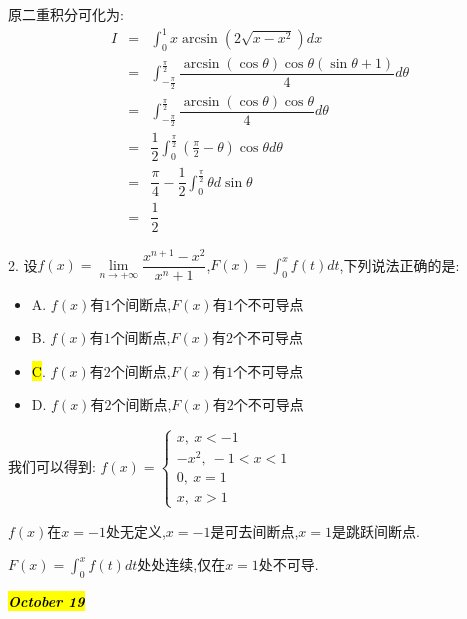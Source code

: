 \begin{solution}

	原二重积分可化为:  
	\begin{eqnarray*}
		I&=&\int_{0}^{1}x\arcsin(2\sqrt{x-x^2})dx\\
		&=&\int_{-\frac{\pi}{2}}^{\frac{\pi}{2}}\dfrac{\arcsin(\cos\theta) \cos\theta(\sin\theta+1)}{4}d\theta\\
		&=&\int_{-\frac{\pi}{2}}^{\frac{\pi}{2}}\dfrac{\arcsin(\cos\theta)\cos\theta}{4}d\theta\\
		&=&\dfrac{1}{2}\int_{0}^{\frac{\pi}{2}}(\frac{\pi}{2}-\theta)\cos\theta d\theta\\
		&=&\dfrac{\pi}{4}-\dfrac{1}{2}\int_{0}^{\frac{\pi}{2}}\theta d\sin\theta\\
		&=&\dfrac{1}{2}
	\end{eqnarray*}
\end{solution}

2. 设$f(x)=\lim\limits_{n\rightarrow+\infty}\dfrac{x^{n+1}-x^2}{x^n+1}$,$F(x)=\int_{0}^{x}f(t)dt$,下列说法正确的是:  
\begin{itemize}
	\item A. $f(x)$有$1$个间断点,$F(x)$有$1$个不可导点
	\item B. $f(x)$有$1$个间断点,$F(x)$有$2$个不可导点
	\item \hl{C}. $f(x)$有$2$个间断点,$F(x)$有$1$个不可导点
	\item D. $f(x)$有$2$个间断点,$F(x)$有$2$个不可导点
\end{itemize}
\begin{solution}

	我们可以得到:  $f(x)=\left\lbrace
	\begin{array}{l}
		x,\ x<-1\\
		-x^2,\ -1<x<1\\
		0,\ x=1\\
		x,\ x>1
	\end{array}
	\right. $
	
	$f(x)$在$x=-1$处无定义,$x=-1$是可去间断点,$x=1$是跳跃间断点.
	
	$F(x)=\int_{0}^{x}f(t)dt$处处连续,仅在$x=1$处不可导.
\end{solution}

\hl{\textbf{\textit{October 19}}}

